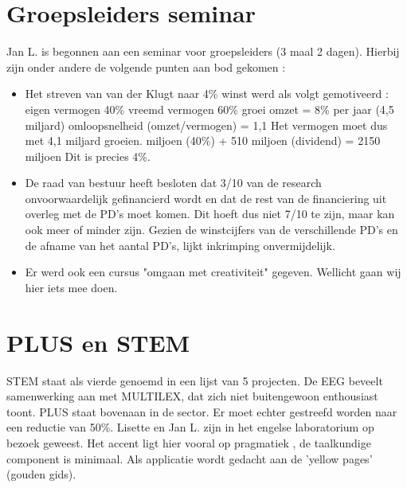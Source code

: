 \section {Groepsleiders seminar}
Jan L. is begonnen aan een seminar voor groepsleiders (3 maal 2 dagen). 
Hierbij zijn onder andere de volgende punten aan bod gekomen :
\begin{itemize}
    \item Het streven van van der Klugt naar 4\% winst werd als volgt 
gemotiveerd :
    \newline
    \newline eigen vermogen 40\%
    \newline vreemd vermogen 60\%
    \newline
    \newline groei omzet = 8\% per jaar (4,5 miljard)
    \newline omloopsnelheid (omzet/vermogen) = 1,1
    \newline
    \newline Het vermogen moet dus met 4,1 miljard groeien.
     miljoen (40\%) + 510 miljoen (dividend) = 2150 miljoen
    \newline Dit is precies 4\%.
    \item De raad van bestuur  heeft besloten dat 3/10 van de 
research onvoorwaardelijk gefinancierd wordt en dat de rest van de financiering 
uit overleg met de PD's moet komen. Dit hoeft dus niet 7/10 te zijn, maar kan 
ook meer of minder zijn. Gezien de winstcijfers van de verschillende PD's  
en de afname van het aantal PD's, lijkt inkrimping onvermijdelijk.
    \item Er werd ook een cursus "omgaan met creativiteit" gegeven. Wellicht 
gaan wij hier iets mee doen.
\end{itemize}

\section {PLUS en STEM}
STEM staat als vierde genoemd in een lijst van 5 projecten. De EEG beveelt 
samenwerking aan met MULTILEX, dat zich niet buitengewoon enthousiast toont.
PLUS staat bovenaan in de sector. Er moet echter gestreefd worden naar een 
reductie van 50\%. Lisette en Jan L. zijn in het engelse laboratorium op 
bezoek geweest. Het accent ligt hier vooral op pragmatiek , de taalkundige
component is minimaal. Als applicatie wordt gedacht aan de 'yellow pages' 
(gouden gids). 

